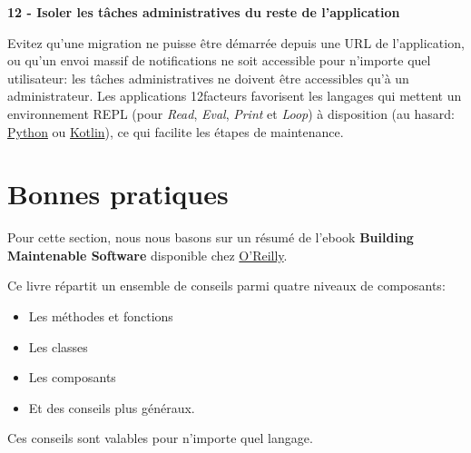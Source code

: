 \documentclass[11pt]{amsbook}
\begin{document}
\textbf{12 - Isoler les tâches administratives du reste de l’application}


Evitez qu’une migration ne puisse être démarrée depuis une URL de l’application, ou qu’un envoi massif de notifications ne soit accessible pour n’importe quel utilisateur: les tâches administratives ne doivent être accessibles qu’à un administrateur.
Les applications 12facteurs favorisent les langages qui mettent un environnement REPL (pour \emph{Read}, \emph{Eval}, \emph{Print} et \emph{Loop}) à disposition (au hasard: \href{https://pythonprogramminglanguage.com/repl/}{Python} ou \href{https://kotlinlang.org/}{Kotlin}), ce qui facilite les étapes de maintenance.


\hypertarget{x-bonnes-pratiques}{\section{Bonnes pratiques}}
Pour cette section, nous nous basons sur un résumé de l’ebook \textbf{Building Maintenable Software} disponible chez \href{http://shop.oreilly.com/product/0636920049555.do}{O’Reilly}.


Ce livre répartit un ensemble de conseils parmi quatre niveaux de composants:


\begin{itemize}

\item Les méthodes et fonctions

\item Les classes

\item Les composants

\item Et des conseils plus généraux.

\end{itemize}


Ces conseils sont valables pour n’importe quel langage.
\end{document}
